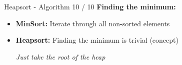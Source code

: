 \begin{frame}{Heapsort - Algorithm 10 / 10}
  \textbf{Finding the minimum:}
  \begin{itemize}
    \item
      \textbf{MinSort:} Iterate through all non-sorted elements
    \item
      \textbf{Heapsort:} Finding the minimum is trivial (concept)
      \begin{center}
        \textit{Just take the root of the heap}
      \end{center}
  \end{itemize}
  \vspace*{1.5em}
\end{frame}